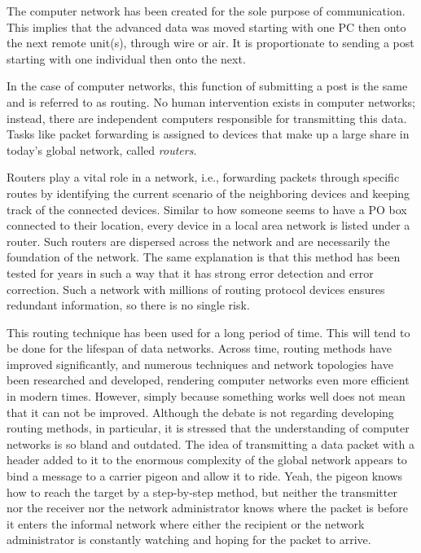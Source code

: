    The computer network has been created for the sole purpose of communication. This implies that the advanced data was moved starting with one PC then onto the next remote unit(s), through wire or air. It is proportionate to sending a post starting with one individual then onto the next.
    
    In the case of computer networks, this function of submitting a post is the same and is referred to as routing. No human intervention exists in computer networks; instead, there are independent computers responsible for transmitting this data. Tasks like packet forwarding is assigned to devices that make up a large share in today's global network, called \textit{routers}.
    
    Routers play a vital role in a network, i.e., forwarding packets through specific routes by identifying the current scenario of the neighboring devices and keeping track of the connected devices.  Similar to how someone seems to have a PO box connected to their location, every device in a local area network is listed under a router.  Such routers are dispersed across the network and are necessarily the foundation of the network.  The same explanation is that this method has been tested for years in such a way that it has strong error detection and error correction. Such a network with millions of routing protocol devices ensures redundant information, so there is no single risk. 
    \vspace{2mm}
    
    This routing technique has been used for a long period of time. This will tend to be done for the lifespan of data networks. Across time, routing methods have improved significantly, and numerous techniques and network topologies \cite{topograph1996} have been researched and developed, rendering computer networks even more efficient in modern times. However, simply because something works well does not mean that it can not be improved. Although the debate is not regarding developing routing methods, in particular, it is stressed that the understanding of computer networks is so bland and outdated. The idea of transmitting a data packet with a header added to it to the enormous complexity of the global network appears to bind a message to a carrier pigeon and allow it to ride. Yeah, the pigeon knows how to reach the target by a step-by-step method, but neither the transmitter nor the receiver nor the network administrator knows where the packet is before it enters the informal network where either the recipient or the network administrator is constantly watching and hoping for the packet to arrive.
    
